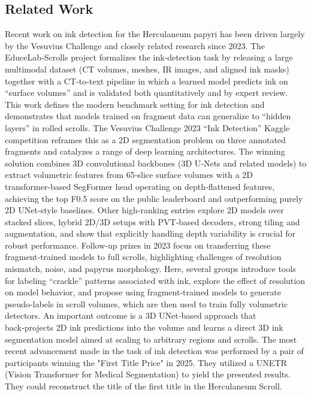 \documentclass[runningheads]{llncs}
\begin{document}
\subsection*{Related Work}
\label{subsec:related work}

Recent work on ink detection for the Herculaneum papyri has been driven largely by the Vesuvius Challenge and closely related research since 2023. The EduceLab‑Scrolls project formalizes the ink‑detection task by releasing a large multimodal dataset (CT volumes, meshes, IR images, and aligned ink masks) together with a CT‑to‑text pipeline in which a learned model predicts ink on “surface volumes” and is validated both quantitatively and by expert review. This work defines the modern benchmark setting for ink detection and demonstrates that models trained on fragment data can generalize to “hidden layers” in rolled scrolls. \cite{parsons2024educelabscrollsverifiablerecoverytext} The Vesuvius Challenge 2023 “Ink Detection” Kaggle competition reframes this as a 2D segmentation problem on three annotated fragments and catalyzes a range of deep learning architectures. The winning solution combines 3D convolutional backbones (3D U‑Nets and related models) to extract volumetric features from 65‑slice surface volumes with a 2D transformer‑based SegFormer head operating on depth‑flattened features, achieving the top F0.5 score on the public leaderboard and outperforming purely 2D UNet‑style baselines. Other high‑ranking entries explore 2D models over stacked slices, hybrid 2D/3D setups with PVT‑based decoders, strong tiling and augmentation, and show that explicitly handling depth variability is crucial for robust performance. \cite{kaggle_1st_place} \cite{kaggle_challenge_vesuvius}
Follow‑up prizes in 2023 focus on transferring these fragment‑trained models to full scrolls, highlighting challenges of resolution mismatch, noise, and papyrus morphology. Here, several groups introduce tools for labeling “crackle” patterns associated with ink, explore the effect of resolution on model behavior, and propose using fragment‑trained models to generate pseudo‑labels in scroll volumes, which are then used to train fully volumetric detectors. An important outcome is a 3D UNet‑based approach that back‑projects 2D ink predictions into the volume and learns a direct 3D ink segmentation model aimed at scaling to arbitrary regions and scrolls. 
The most recent advancement made in the task of ink detection was performed by a pair of participants winning the "First Title Price" in 2025. They utilized a UNETR (Vision Transformer for Medical Segmentation) to yield the presented results. They could reconstruct the title of the first title in the Herculaneum Scroll.
\end{document}
